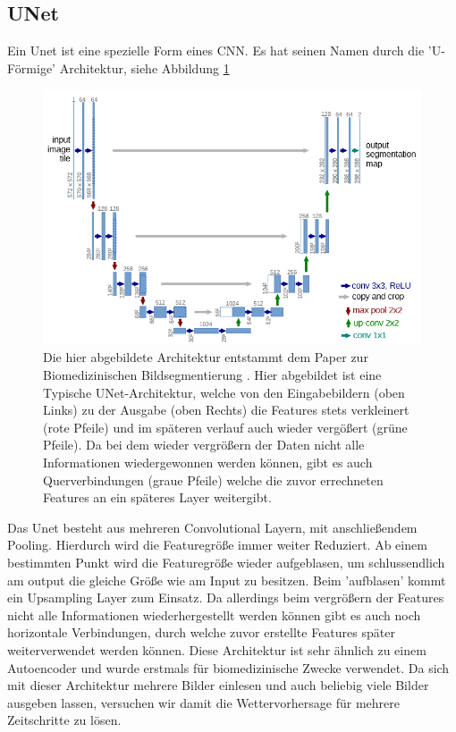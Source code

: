 \subsection{UNet}
\label{kapitelUNet}
Ein Unet ist eine spezielle Form eines CNN. Es hat seinen Namen durch die 'U-Förmige' Architektur, siehe Abbildung \ref{imgUNetA}
\begin{figure}[h]
	\centering
	\includegraphics[width=\linewidth]{pics/UNet_Biomedical}
	\caption[UNet aus Paper von O. Ronneberger, P. Fischer und T. Brox]{Die hier abgebildete Architektur entstammt dem Paper zur Biomedizinischen Bildsegmentierung \cite{DBLP:journals/corr/RonnebergerFB15}. Hier abgebildet ist eine Typische UNet-Architektur, welche von den Eingabebildern (oben Links) zu der Ausgabe (oben Rechts) die Features stets verkleinert (rote Pfeile) und im späteren verlauf auch wieder vergößert (grüne Pfeile). Da bei dem wieder vergrößern der Daten nicht alle Informationen wiedergewonnen werden können, gibt es auch Querverbindungen (graue Pfeile) welche die zuvor errechneten Features an ein späteres Layer weitergibt.}
	\label{imgUNetA}
\end{figure}

Das Unet besteht aus mehreren Convolutional Layern, mit anschließendem Pooling. Hierdurch wird die Featuregröße immer weiter Reduziert. Ab einem bestimmten Punkt wird die Featuregröße wieder aufgeblasen, um schlussendlich am output die gleiche Größe wie am Input zu besitzen. Beim 'aufblasen' kommt ein Upsampling Layer zum Einsatz. Da allerdings beim vergrößern der Features nicht alle Informationen wiederhergestellt werden können gibt es auch noch horizontale Verbindungen, durch welche zuvor erstellte Features später weiterverwendet werden können.
Diese Architektur ist sehr ähnlich zu einem Autoencoder und wurde erstmals für biomedizinische Zwecke verwendet. Da sich mit dieser Architektur mehrere Bilder einlesen und auch beliebig viele Bilder ausgeben lassen, versuchen wir damit die Wettervorhersage für mehrere Zeitschritte zu lösen.

